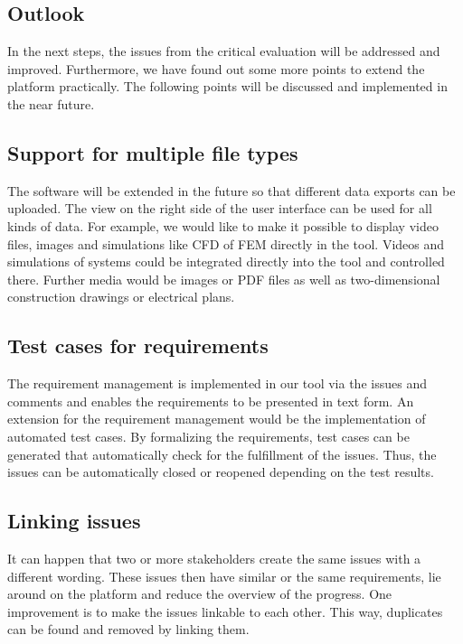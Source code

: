 \subsection*{Outlook}
In the next steps, the issues from the critical evaluation will be addressed and improved. Furthermore, we have found out some more points to extend the platform practically. The following points will be discussed and implemented in the near future.

\subsection*{Support for multiple file types}
The software will be extended in the future so that different data exports can be uploaded. The view on the right side of the user interface can be used for all kinds of data. For example, we would like to make it possible to display video files, images and simulations like CFD of FEM directly in the tool. Videos and simulations of systems could be integrated directly into the tool and controlled there. Further media would be images or PDF files as well as two-dimensional construction drawings or electrical plans.

\subsection*{Test cases for requirements}
The requirement management is implemented in our tool via the issues and comments and enables the requirements to be presented in text form. An extension for the requirement management would be the implementation of automated test cases. By formalizing the requirements, test cases can be generated that automatically check for the fulfillment of the issues. Thus, the issues can be automatically closed or reopened depending on the test results.

\subsection*{Linking issues}
It can happen that two or more stakeholders create the same issues with a different wording. These issues then have similar or the same requirements, lie around on the platform and reduce the overview of the progress. One improvement is to make the issues linkable to each other. This way, duplicates can be found and removed by linking them.

